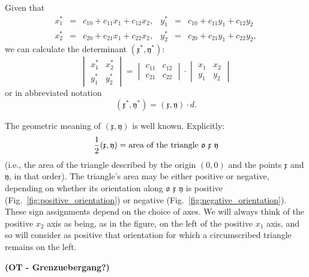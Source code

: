 \documentclass[11pt]{book} \usepackage{amssymb}
\newcommand{\myvec}[1]{\mathfrak{#1}}
\newcommand{\vecx}{\myvec{x}}
\newcommand{\vecy}{\myvec{y}}
\begin{document}
Given that
\begin{equation}
  \label{eq:xy_affinity}
  \begin{array}{rclrcl}
    x_1^* &=& c_{10}+c_{11}x_1+c_{12}x_2, &y_1^* &=& c_{10}+c_{11}y_1+c_{12}y_2\\
    x_2^* &=& c_{20}+c_{21}x_1+c_{22}x_2, &y_2^* &=& c_{20}+c_{21}y_1+c_{22}y_2,
  \end{array}  
\end{equation}
we can calculate the determinant $(\vecx^*,\vecy^*)$:
\begin{equation}
  \label{eq:xy_det_transformed}
  \begin{vmatrix}x_1^*&x_2^*\\y_1^*&y_2^*\end{vmatrix}=\begin{vmatrix}c_{11}&c_{12}\\c_{21}&c_{22}\end{vmatrix}\cdot\begin{vmatrix}x_1&x_2\\y_1&y_2\end{vmatrix}
\end{equation}
or in abbreviated notation
\begin{equation}
  \label{eq:xy_det_transformed_short}
  (\vecx^*,\vecy^*)=(\vecx,\vecy)\cdot d.
\end{equation}

The geometric meaning of $(\vecx,\vecy)$ is well known. Explicitly:
\begin{equation}
  \label{eq:triangle_area}
  {1\over 2}(\vecx,\vecy)=\mbox{area of the triangle $\myvec{o}$ $\vecx$ $\vecy$}
\end{equation}
(i.e., the area of the triangle described by the origin $(0,0)$ and the 
points $\vecx$ and $\vecy$, in that order). The triangle's area may
be either positive or negative, depending on whether its orientation 
along $\myvec{o}$ $\vecx$ $\vecy$ is
positive (Fig.~\ref{fig:positive_orientation}) or negative 
(Fig.~\ref{fig:negative_orientation}). These sign assignments depend on the
choice of axes. We will always think of the positive $x_2$ axis as being,
as in the figure, on the left of the positive $x_1$ axis, and so will consider 
as positive that orientation for which a circumscribed triangle remains on 
the left.

{\bf (OT - Grenzuebergang?)}
\end{document}
